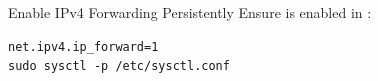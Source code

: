 \begin{frame}[fragile]{Enable IPv4 Forwarding Persistently}
  Ensure  is enabled in :
  \vspace{0.35cm}
  \begin{verbatim}
net.ipv4.ip_forward=1
sudo sysctl -p /etc/sysctl.conf
  \end{verbatim}
\end{frame}
